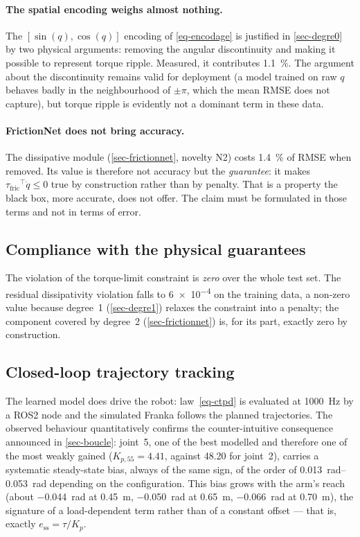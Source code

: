 \documentclass[a4paper, oneside]{article}
\newcommand{\q}{\ensuremath{q}}
\newcommand{\qd}{\ensuremath{\dot{q}}}
\newcommand{\taufric}{\ensuremath{\tau_{\mathrm{fric}}}}
\begin{document}
\paragraph{The spatial encoding weighs almost nothing.} The
$[\sin(\q), \cos(\q)]$ encoding of \cref{eq-encodage} is justified in
\cref{sec-degre0} by two physical arguments: removing the angular discontinuity
and making it possible to represent torque ripple. Measured, it contributes
\SI{1.1}{\percent}. The argument about the discontinuity remains valid for
deployment (a model trained on raw $\q$ behaves badly in the neighbourhood of
$\pm\pi$, which the mean RMSE does not capture), but torque ripple is
evidently not a dominant term in these data.

\paragraph{FrictionNet does not bring accuracy.} The dissipative module
(\cref{sec-frictionnet}, novelty N2) costs \SI{1.4}{\percent} of RMSE when
removed. Its value is therefore not accuracy but the \emph{guarantee}: it makes
$\taufric^{\top}\qd \le 0$ true by construction rather than by penalty. That is
a property the black box, more accurate, does not offer. The claim must be
formulated in those terms and not in terms of error.

\subsection{Compliance with the physical guarantees}
\label{sec-res-garanties}

The violation of the torque-limit constraint is \emph{zero} over the whole test
set. The residual dissipativity violation falls to \num{6e-4} on the training
data, a non-zero value because degree~1 (\cref{sec-degre1}) relaxes the
constraint into a penalty; the component covered by degree~2
(\cref{sec-frictionnet}) is, for its part, exactly zero by construction.

\subsection{Closed-loop trajectory tracking}
\label{sec-res-suivi}

The learned model does drive the robot: law~\eqref{eq-ctpd} is evaluated at
\SI{1000}{\hertz} by a ROS2 node and the simulated Franka follows the planned
trajectories. The observed behaviour quantitatively confirms the
counter-intuitive consequence announced in \cref{sec-boucle}: joint~5, one of
the best modelled and therefore one of the most weakly gained
($K_{p,55} = \num{4.41}$, against \num{48.20} for joint~2), carries a
systematic steady-state bias, always of the same sign, of the order of
\SIrange{0.013}{0.053}{\radian} depending on the configuration. This bias grows
with the arm's reach (about \SI{-0.044}{\radian} at \SI{0.45}{\meter},
\SI{-0.050}{\radian} at \SI{0.65}{\meter}, \SI{-0.066}{\radian} at
\SI{0.70}{\meter}), the signature of a load-dependent term rather than of a
constant offset --- that is, exactly $e_{\mathrm{ss}} = \tau/K_p$.
\end{document}
